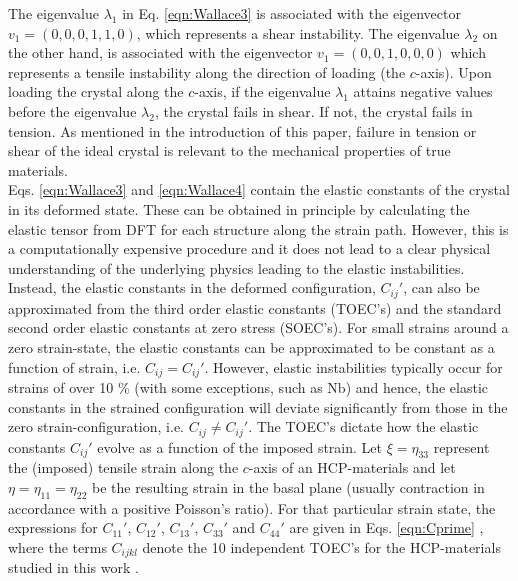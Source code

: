 \documentclass[showpacs,aps,floatfix,prb,reprint,superscriptaddress]{revtex4-1}
\begin{document}
The eigenvalue $\lambda_{1}$ in Eq. \ref{eqn:Wallace3} is associated with the eigenvector $v_{1} = \left(0, 0, 0, 1, 1, 0\right)$, which represents a shear instability. The eigenvalue $\lambda_{2}$ on the other hand, is associated with the eigenvector $v_{1} = \left(0, 0, 1, 0, 0, 0\right)$ which represents a tensile instability along the direction of loading (the $c$-axis). Upon loading the crystal along the $c$-axis, if the eigenvalue $\lambda_{1}$ attains negative values before the eigenvalue $\lambda_{2}$, the crystal fails in shear. If not, the crystal fails in tension. As mentioned in the introduction of this paper, failure in tension or shear of the ideal crystal is relevant to the mechanical properties of true materials.  \\

Eqs. \ref{eqn:Wallace3} and \ref{eqn:Wallace4} contain the elastic constants of the crystal in its deformed state. These can be obtained in principle by calculating the elastic tensor from DFT for each structure along the strain path. However, this is a computationally expensive procedure and it does not lead to a clear physical understanding of the underlying physics leading to the elastic instabilities. Instead, the elastic constants in the deformed configuration, $C_{ij}'$, can also be approximated from the third order elastic constants (TOEC's) and the standard second order elastic constants at zero stress (SOEC's). For small strains around a zero strain-state, the elastic constants can be approximated to be constant as a function of strain, i.e. $C_{ij} = C_{ij}'$. However, elastic instabilities typically occur for strains of over 10 \% (with some exceptions, such as Nb) and hence, the elastic constants in the strained configuration will deviate significantly from those in the zero strain-configuration, i.e. $C_{ij} \neq C_{ij}'$. The TOEC's dictate how the elastic constants $C_{ij}'$ evolve as a function of the imposed strain. Let $\xi = \eta_{33}$ represent the (imposed) tensile strain along the $c$-axis of an HCP-materials and let $\eta = \eta_{11} = \eta_{22}$ be the resulting strain in the basal plane (usually contraction in accordance with a positive Poisson's ratio). For that particular strain state, the expressions for $C_{11}'$, $C_{12}'$, $C_{13}'$, $C_{33}'$ and $C_{44}'$ are given in Eqs. \ref{eqn:Cprime} \cite{rao1969third,rao1974anderson}, where the terms $C_{ijkl}$ denote the 10 independent TOEC's for the HCP-materials studied in this work \cite{hearmon1953third,rose1968higher,fumi1951third,fumi1952third}. 
\end{document}
